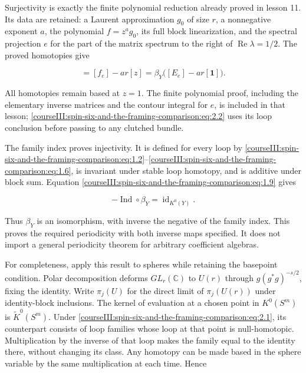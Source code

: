 Surjectivity is exactly the finite polynomial reduction already proved in lesson 11. Its data are retained: a Laurent approximation \(g_0\) of size \(r\), a nonnegative exponent \(a\), the polynomial \(f=z^ag_0\), its full block linearization, and the spectral projection \(e\) for the part of the matrix spectrum to the right of \(\operatorname{Re}\lambda=1/2\). The proved homotopies give

\begin{equation}
[g]=[f_e]-ar[z]
=\beta_Y\bigl([E_e]-ar[\mathbf1]\bigr).
\label{courseIII:spin-six-and-the-framing-comparison:eq:2.2}
\end{equation}

All homotopies remain based at \(z=1\). The finite polynomial proof, including the elementary inverse matrices and the contour integral for \(e\), is included in that lesson; \eqref{courseIII:spin-six-and-the-framing-comparison:eq:2.2} uses its loop conclusion before passing to any clutched bundle.

The family index proves injectivity. It is defined for every loop by \eqref{courseIII:spin-six-and-the-framing-comparison:eq:1.2}--\eqref{courseIII:spin-six-and-the-framing-comparison:eq:1.6}, is invariant under stable loop homotopy, and is additive under block sum. Equation \eqref{courseIII:spin-six-and-the-framing-comparison:eq:1.9} gives

\begin{equation}
-\operatorname{Ind}\circ\beta_Y
=\operatorname{id}_{K^0(Y)}.
\label{courseIII:spin-six-and-the-framing-comparison:eq:2.3}
\end{equation}

Thus \(\beta_Y\) is an isomorphism, with inverse the negative of the family index. This proves the required periodicity with both inverse maps specified. It does not import a general periodicity theorem for arbitrary coefficient algebras.

For completeness, apply this result to spheres while retaining the basepoint condition. Polar decomposition deforms \(GL_r(\mathbb C)\) to \(U(r)\) through \(g(g^*g)^{-s/2}\), fixing the identity. Write \(\pi_j(U)\) for the direct limit of \(\pi_j(U(r))\) under identity-block inclusions. The kernel of evaluation at a chosen point in \(K^0(S^m)\) is \(\widetilde K^0(S^m)\). Under \eqref{courseIII:spin-six-and-the-framing-comparison:eq:2.1}, its counterpart consists of loop families whose loop at that point is null-homotopic. Multiplication by the inverse of that loop makes the family equal to the identity there, without changing its class. Any homotopy can be made based in the sphere variable by the same multiplication at each time. Hence

